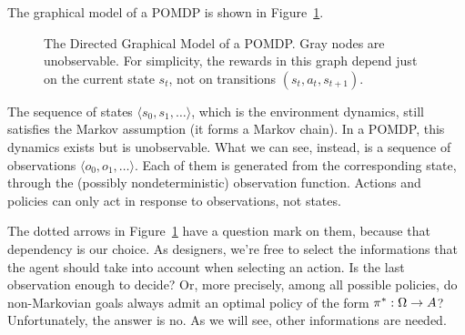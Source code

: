 The graphical model of a POMDP is shown in Figure~\ref{fig:pomdp}.
\begin{figure}
	\centering
	\caption{The Directed Graphical Model of a POMDP. Gray nodes are
	unobservable. For simplicity, the rewards in this graph depend just on the
	current state $s_t$, not on transitions ${(s_t, a_t, s_{t+1})}$.}
	\label{fig:pomdp}
\end{figure}
The sequence of states ${\langle s_0, s_1, \dots \rangle}$, which is the
environment dynamics, still satisfies the Markov assumption (it forms a Markov
chain). In a POMDP, this dynamics exists but is unobservable. What we can
see, instead, is a sequence of observations ${ \langle o_0, o_1, \dots
\rangle}$. Each of them is generated from the corresponding state, through the
(possibly nondeterministic) observation function. Actions and policies can
only act in response to observations, not states.

The dotted arrows in Figure~\ref{fig:pomdp} have a question mark on them,
because that dependency is our choice. As designers, we're free to select
the informations that the agent should take into account when selecting an
action. Is the last observation enough to decide? Or, more precisely, among
all possible policies, do non-Markovian goals always admit an optimal policy
of the form $\pi^*: \Omega \to A$? Unfortunately, the answer is no. As we
will see, other informations are needed.

